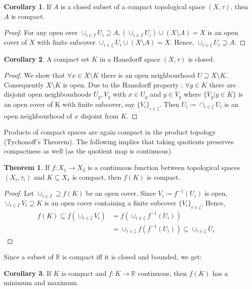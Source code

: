 \documentclass[10pt,a4paper]{article}
\theoremstyle{definition}
\theoremstyle{cor}
\newtheorem{cor}{Corollary}
\theoremstyle{theorem}
\newtheorem{theorem}{Theorem}
\theoremstyle{lemma}
\theoremstyle{example}
\begin{document}
\begin{cor}
If $A$ is a closed subset of a compact topological space $(X, \tau)$, then $A$ is compact.
\end{cor}
\begin{proof}
For any open over $\cup_{i\in I} U_i \supseteq A, (\cup_{i\in I} U_i)\cup (X\setminus A) = X$ is an open cover of $X$ with finite subcover $\cup_{i\in\zeta} U_{i} \cup (X \setminus A) = X$. Hence, $\cup_{i \in \zeta} U_i \supseteq A$.
\end{proof}

\begin{cor}
A compact set $K$ in a Hansdorff space $(X, \tau)$ is closed.
\end{cor}
\begin{proof}
We show that $\forall x\in X \setminus K$ there is an open neighbourhood $U \supseteq X \setminus K$. Consequently $X \setminus K$ is open. Due to the Hansdorff property : $\forall y \in K$ there are disjoint open neighbourhoods $U_y, V_y$ with $x \in U_y$ and $y\in V_y$ where $\{V_y | y \in K\}$ is an open cover of K with finite subcover, say $\{V_i \}_{i \in \zeta}$. Then $U_i \coloneqq \cap_{i\in\zeta} U_i$ is an open neighbourhood of $x$ disjoint from $K$.
\end{proof}
\noindent Products of compact spaces are again compact in the product topology (Tychonoff's Theorem). The following implies that taking quotients preserves compactness as well (as the quotient map is continuous).

\begin{theorem}
If $f: X_1 \rightarrow X_2 $ is a continuous function between topological spaces $(X_i, \tau_i)$ and $K \subseteq X_1$ is compact, then $f(K)$ is compact. 
\end{theorem}
\begin{proof}
Let $\cup_{i \in I} \supseteq f(K)$ be an open cover. Since $V_i \coloneqq f^{-1}(U_i)$ is open, $\cup _{i \in I} V_i \supseteq K$ is an open cover containing a finite subcover $\{ V_i\}_{i \in \zeta}$. Hence, 
\begin{align*}
f(K) \subseteq f\left(\cup_{i\in\zeta} V_i\right) &= f\left(\cup_{i\in\zeta} f^{-1}(U_i)\right) \\
&= \cup_{i\in\zeta} f\left(f^{-1}(U_i)\right) \subseteq \cup_{i\in\zeta} U_i
\end{align*} 
\end{proof}

\noindent Since a subset of $\mathbb{R}$ is compact iff it is closed and bounded, we get: 
\begin{cor}
If $K$ is compact and $f: K \rightarrow \mathbb{R}$ continuous, then $f(K)$ has a minimum and maximum.
\end{cor}
\end{document}

